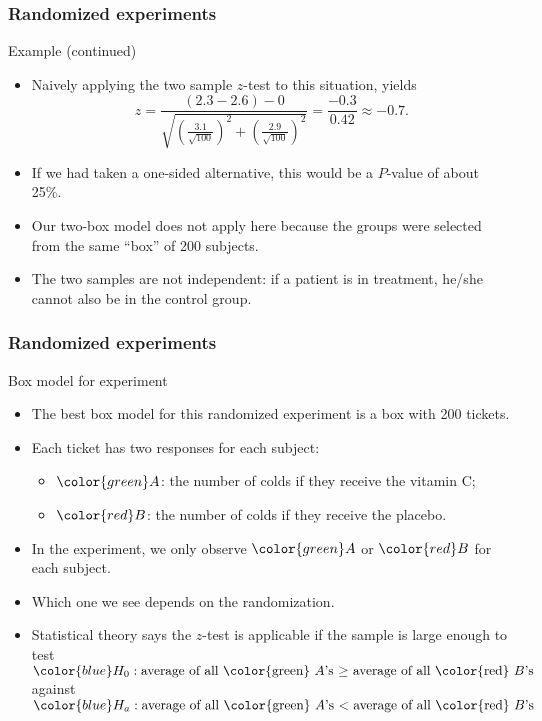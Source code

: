 \documentclass[handout]{beamer}
\begin{document}
   \begin{frame} \frametitle{Randomized experiments}

   \begin{block}
   {Example (continued)}
   \begin{itemize}
   \item Naively applying the two sample
   $z$-test to this situation, yields
   $$
   z = \frac{(2.3 - 2.6) - 0}{\sqrt{\left(\frac{3.1}{\sqrt{100}}\right)^2 + \left(\frac{2.9}{\sqrt{100}}\right)^2}} = \frac{-0.3}{0.42} \approx -0.7.
   $$


   \item If we had taken a one-sided alternative, this would be a $P$-value of about 25\%.

   \item Our two-box model does not apply here because the groups were selected
   from the same ``box'' of 200 subjects.

   \item The two samples are not independent: if a patient is in treatment,
   he/she cannot also be in the control group.

   \end{itemize}
   \end{block}
   \end{frame}


   \begin{frame} \frametitle{Randomized experiments}

   \begin{block}
   {Box model for experiment}
   \begin{itemize}
   \item The best box model for this randomized experiment is a box
   with 200 tickets.

   \item Each ticket has two responses for each subject:
   \begin{itemize}
   \item ${\color{green} A}$: the number of colds if they receive the vitamin C;
   \item ${\color{red} B}$: the number of colds if they receive the placebo.
   \end{itemize}

   \item In the experiment, we only observe ${\color{green} A}$ or
   ${\color{red} B}$ for each subject.

   \item Which one we see depends on the randomization.

   \item Statistical theory says the $z$-test is applicable if the
   sample is large enough to test
   ${\color{blue} H_0: \text{average of all {\color{green} $A$}'s $\geq$ average of all {\color{red} $B$}'s}}$
    against ${\color{blue} H_a: \text{average of all {\color{green} $A$}'s $<$
    average of all {\color{red} $B$}'s}}$
   \end{itemize}
   \end{block}
   \end{frame}
\end{document}
